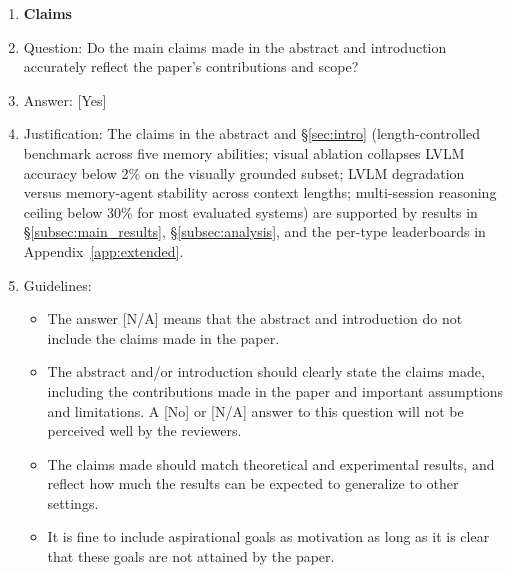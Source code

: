 \documentclass{llmxive}
\providecommand{\answerYes}[1][]{[Yes]#1}
\providecommand{\answerNo}[1][]{[No]#1}
\providecommand{\answerNA}[1][]{[N/A]#1}
\begin{document}
\begin{enumerate}

\item {\bf Claims}
    \item[] Question: Do the main claims made in the abstract and introduction accurately reflect the paper's contributions and scope?
    \item[] Answer: \answerYes{}
    \item[] Justification: The claims in the abstract and \S\ref{sec:intro} (length-controlled benchmark across five memory abilities; visual ablation collapses LVLM accuracy below 2\% on the visually grounded subset; LVLM degradation versus memory-agent stability across context lengths; multi-session reasoning ceiling below 30\% for most evaluated systems) are supported by results in \S\ref{subsec:main_results}, \S\ref{subsec:analysis}, and the per-type leaderboards in Appendix~\ref{app:extended}.
    \item[] Guidelines:
    \begin{itemize}
        \item The answer \answerNA{} means that the abstract and introduction do not include the claims made in the paper.
        \item The abstract and/or introduction should clearly state the claims made, including the contributions made in the paper and important assumptions and limitations. A \answerNo{} or \answerNA{} answer to this question will not be perceived well by the reviewers.
        \item The claims made should match theoretical and experimental results, and reflect how much the results can be expected to generalize to other settings.
        \item It is fine to include aspirational goals as motivation as long as it is clear that these goals are not attained by the paper.
    \end{itemize}


\end{enumerate}
\end{document}
